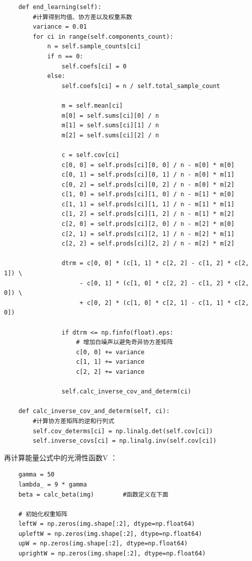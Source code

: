 \documentclass[12pt,a4paper]{article}
\begin{document}
\begin{CJK}{UTF8}{gbsn}
\begin{sloppypar}
\begin{lstlisting}
    def end_learning(self):
        #计算得到均值、协方差以及权重系数
        variance = 0.01
        for ci in range(self.components_count):
            n = self.sample_counts[ci]
            if n == 0:
                self.coefs[ci] = 0
            else:
                self.coefs[ci] = n / self.total_sample_count

                m = self.mean[ci]
                m[0] = self.sums[ci][0] / n
                m[1] = self.sums[ci][1] / n
                m[2] = self.sums[ci][2] / n

                c = self.cov[ci]
                c[0, 0] = self.prods[ci][0, 0] / n - m[0] * m[0]
                c[0, 1] = self.prods[ci][0, 1] / n - m[0] * m[1]
                c[0, 2] = self.prods[ci][0, 2] / n - m[0] * m[2]
                c[1, 0] = self.prods[ci][1, 0] / n - m[1] * m[0]
                c[1, 1] = self.prods[ci][1, 1] / n - m[1] * m[1]
                c[1, 2] = self.prods[ci][1, 2] / n - m[1] * m[2]
                c[2, 0] = self.prods[ci][2, 0] / n - m[2] * m[0]
                c[2, 1] = self.prods[ci][2, 1] / n - m[2] * m[1]
                c[2, 2] = self.prods[ci][2, 2] / n - m[2] * m[2]

                dtrm = c[0, 0] * (c[1, 1] * c[2, 2] - c[1, 2] * c[2, 1]) \
                     - c[0, 1] * (c[1, 0] * c[2, 2] - c[1, 2] * c[2, 0]) \
                     + c[0, 2] * (c[1, 0] * c[2, 1] - c[1, 1] * c[2, 0])

                if dtrm <= np.finfo(float).eps:
                    # 增加白噪声以避免奇异协方差矩阵
                    c[0, 0] += variance
                    c[1, 1] += variance
                    c[2, 2] += variance

                self.calc_inverse_cov_and_determ(ci)

    def calc_inverse_cov_and_determ(self, ci):
        #计算协方差矩阵的逆和行列式
        self.cov_determs[ci] = np.linalg.det(self.cov[ci])
        self.inverse_covs[ci] = np.linalg.inv(self.cov[ci])
\end{lstlisting}
再计算能量公式中的光滑性函数V ：\\
\begin{lstlisting}
    gamma = 50
    lambda_ = 9 * gamma  
    beta = calc_beta(img)        #函数定义在下面

    # 初始化权重矩阵
    leftW = np.zeros(img.shape[:2], dtype=np.float64)
    upleftW = np.zeros(img.shape[:2], dtype=np.float64)
    upW = np.zeros(img.shape[:2], dtype=np.float64)
    uprightW = np.zeros(img.shape[:2], dtype=np.float64)


\end{lstlisting}
\end{sloppypar}
\end{CJK}
\end{document}
